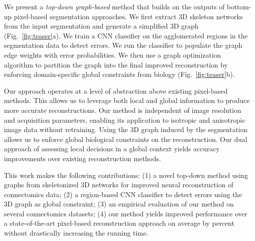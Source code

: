 We present a \textit{top-down graph-based} method that builds on the outputs of bottom-up pixel-based segmentation approaches. We first extract 3D skeleton networks from the input segmentation and generate a simplified 3D graph (Fig.~\ref{fig:teaser}a). We train a CNN classifier on the agglomerated regions in the segmentation data to detect errors. We run the classifier to populate the graph edge weights with error probabilities. We then use a graph optimization algorithm to partition the graph into the final improved reconstruction by enforcing domain-specific global constraints from biology (Fig.~\ref{fig:teaser}b).

Our approach operates at a level of abstraction above existing pixel-based methods. This allows us to leverage both local and global information to produce more accurate reconstructions. Our method is independent of image resolution and acquisition parameters, enabling its application to isotropic and anisotropic image data without retraining. Using the 3D graph induced by the segmentation allows us to enforce global biological constraints on the reconstruction. Our dual approach of assessing local decisions in a global context yields accuracy improvements over existing reconstruction methods.

This work makes the following contributions: (1) a novel top-down method using  graphs from skeletonized 3D networks for improved neural reconstruction of connectomics data; (2) a region-based CNN classifier to detect errors using the 3D graph as global constraint; (3) an empirical evaluation of our method on several connectomics datasets; (4) our method yields improved performance over a state-of-the-art pixel-based reconstruction approach on average by  percent without drastically increasing the running time.
